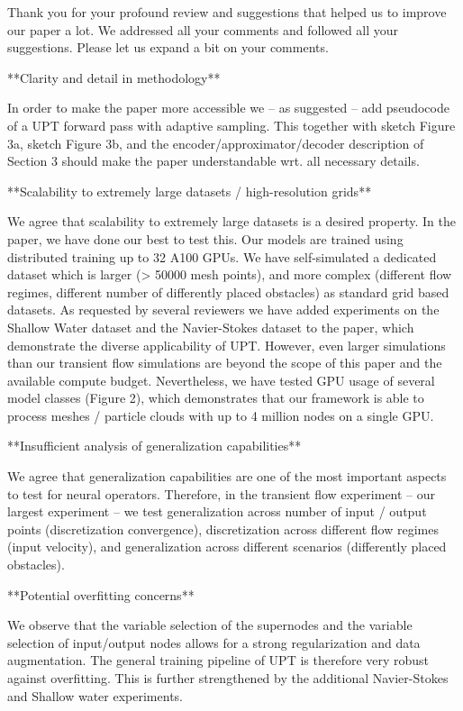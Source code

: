 Thank you for your profound review and suggestions that helped us to improve our paper a lot. We addressed all your comments and followed all your suggestions. Please let us expand a bit on your comments.


**Clarity and detail in methodology**


In order to make the paper more accessible we -- as suggested -- add pseudocode of a UPT forward pass with adaptive sampling. This together with sketch Figure 3a, sketch Figure 3b, and the encoder/approximator/decoder description of Section 3 should make the paper understandable wrt. all necessary details.

**Scalability to extremely large datasets / high-resolution grids**

We agree that scalability to extremely large datasets is a desired property. In the paper, we have done our best to test this. Our models are trained using distributed training up to 32 A100 GPUs. We have self-simulated a dedicated dataset which is larger (> 50000 mesh points), and more complex (different flow regimes, different number of differently placed obstacles) as standard grid based datasets. As requested by several reviewers we have added experiments on the Shallow Water dataset and the Navier-Stokes dataset to the paper, which demonstrate the diverse applicability of UPT. However, even larger simulations than our transient flow simulations are beyond the scope of this paper and the available compute budget. Nevertheless, we have tested GPU usage of several model classes (Figure 2), which demonstrates that our framework is able to process meshes / particle clouds with up to 4 million nodes on a single GPU.

**Insufficient analysis of generalization capabilities**

We agree that generalization capabilities are one of the most important aspects to test for neural operators. Therefore, in the transient flow experiment -- our largest experiment -- we test generalization across number of input / output points (discretization convergence), discretization across different flow regimes (input velocity), and generalization across different scenarios (differently placed obstacles).


**Potential overfitting concerns**

We observe that the variable selection of the supernodes and the variable selection of input/output nodes allows for a strong regularization and data augmentation. The general training pipeline of UPT is therefore very robust against overfitting. This is further strengthened by the additional Navier-Stokes and Shallow water experiments.

